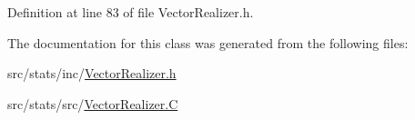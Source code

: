 Definition at line 83 of file Vector\-Realizer.\-h.



The documentation for this class was generated from the following files\-:\begin{DoxyCompactItemize}
\item 
src/stats/inc/\hyperlink{_vector_realizer_8h}{Vector\-Realizer.\-h}\item 
src/stats/src/\hyperlink{_vector_realizer_8_c}{Vector\-Realizer.\-C}\end{DoxyCompactItemize}
